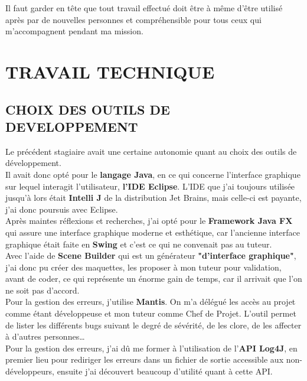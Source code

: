 Il faut garder en tête que tout travail effectué doit être à même d’être utilisé après par de nouvelles personnes et compréhensible pour tous ceux qui m’accompagnent pendant ma mission.


\section{TRAVAIL TECHNIQUE}
\subsection{CHOIX DES OUTILS DE DEVELOPPEMENT}

Le précédent stagiaire avait une certaine autonomie quant au choix des outils de développement.\\

Il avait donc opté pour le \textbf{langage Java}, en ce qui concerne l’interface graphique sur lequel interagit l’utilisateur, \textbf{l’IDE Eclipse}. L’IDE que j’ai toujours utilisée jusqu’à lors était \textbf{Intelli J} de la distribution Jet Brains, mais celle-ci est payante, j’ai donc poursuis avec Eclipse.\\

Après maintes réflexions et recherches, j’ai opté pour le \textbf{Framework Java FX} qui assure une interface graphique moderne et esthétique, car l’ancienne interface graphique était faite en \textbf{Swing} et c’est ce qui ne convenait pas au tuteur.\\

Avec l’aide de \textbf{Scene Builder} qui est un générateur \textbf{"d'interface graphique"}, j’ai donc pu créer des maquettes, les proposer à mon tuteur pour validation, avant de coder, ce qui représente un énorme gain de temps, car il arrivait que l’on ne soit pas d’accord.\\

Pour la gestion des erreurs, j’utilise \textbf{Mantis}. On m’a délégué les accès au projet comme étant développeuse et mon tuteur comme Chef de Projet. L’outil permet de lister les différents bugs suivant le degré de sévérité, de les clore, de les affecter à d’autres personnes…\\

Pour la gestion des erreurs, j’ai dû me former à l’utilisation de l’\textbf{API Log4J}, en premier lieu pour rediriger les erreurs dans un fichier de sortie accessible aux non-développeurs, ensuite j’ai découvert beaucoup d’utilité quant à cette API.\\

